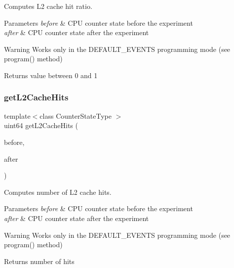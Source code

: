 Computes L2 cache hit ratio. 


\begin{DoxyParams}{Parameters}
{\em before} & C\+PU counter state before the experiment \\
\hline
{\em after} & C\+PU counter state after the experiment \\
\hline
\end{DoxyParams}
\begin{DoxyWarning}{Warning}
Works only in the D\+E\+F\+A\+U\+L\+T\+\_\+\+E\+V\+E\+N\+TS programming mode (see program() method) 
\end{DoxyWarning}
\begin{DoxyReturn}{Returns}
value between 0 and 1 
\end{DoxyReturn}
\mbox{\label{classBasicCounterState_a459367d7877d09594c2ecd85e04cae61}} 
\subsubsection{get\+L2\+Cache\+Hits}
{\footnotesize\ttfamily template$<$class Counter\+State\+Type $>$ \\
uint64 get\+L2\+Cache\+Hits (\begin{DoxyParamCaption}\item[{const Counter\+State\+Type \&}]{before,  }\item[{const Counter\+State\+Type \&}]{after }\end{DoxyParamCaption})\hspace{0.3cm}{\ttfamily [friend]}}



Computes number of L2 cache hits. 


\begin{DoxyParams}{Parameters}
{\em before} & C\+PU counter state before the experiment \\
\hline
{\em after} & C\+PU counter state after the experiment \\
\hline
\end{DoxyParams}
\begin{DoxyWarning}{Warning}
Works only in the D\+E\+F\+A\+U\+L\+T\+\_\+\+E\+V\+E\+N\+TS programming mode (see program() method) 
\end{DoxyWarning}
\begin{DoxyReturn}{Returns}
number of hits 
\end{DoxyReturn}
\mbox{\label{classBasicCounterState_a291eeab262fdb93de08cdfdf50dbad58}} 
